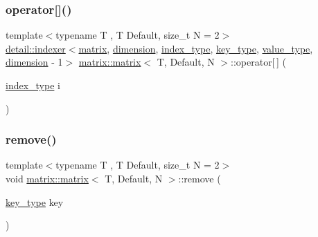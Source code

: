 \mbox{\label{structmatrix_1_1matrix_a06d5b697d7f64430305967f4adc80633}} 
\subsubsection{\texorpdfstring{operator[]()}{operator[]()}}
{\footnotesize\ttfamily template$<$typename T , T Default, size\+\_\+t N = 2$>$ \\
\hyperlink{structmatrix_1_1detail_1_1indexer}{detail\+::indexer}$<$\hyperlink{structmatrix_1_1matrix}{matrix}, \hyperlink{structmatrix_1_1matrix_a7d76bd51fd998974f59ea4035e053f74}{dimension}, \hyperlink{structmatrix_1_1matrix_a87b61e7f35dcd5991cd3f243cfeced06}{index\+\_\+type}, \hyperlink{structmatrix_1_1matrix_af7b5498ac1b615cb9ef51bd185a2557e}{key\+\_\+type}, \hyperlink{structmatrix_1_1matrix_ab940e7a84942339cdee7c0f0d3bd8ef9}{value\+\_\+type}, \hyperlink{structmatrix_1_1matrix_a7d76bd51fd998974f59ea4035e053f74}{dimension} -\/ 1$>$ \hyperlink{structmatrix_1_1matrix}{matrix\+::matrix}$<$ T, Default, N $>$\+::operator\mbox{[}$\,$\mbox{]} (\begin{DoxyParamCaption}\item[{\hyperlink{structmatrix_1_1matrix_a87b61e7f35dcd5991cd3f243cfeced06}{index\+\_\+type}}]{i }\end{DoxyParamCaption})\hspace{0.3cm}{\ttfamily [inline]}}

\mbox{\label{structmatrix_1_1matrix_ac15f926245fe20e9dfee3f0695299550}} 
\subsubsection{\texorpdfstring{remove()}{remove()}}
{\footnotesize\ttfamily template$<$typename T , T Default, size\+\_\+t N = 2$>$ \\
void \hyperlink{structmatrix_1_1matrix}{matrix\+::matrix}$<$ T, Default, N $>$\+::remove (\begin{DoxyParamCaption}\item[{\hyperlink{structmatrix_1_1matrix_af7b5498ac1b615cb9ef51bd185a2557e}{key\+\_\+type}}]{key }\end{DoxyParamCaption})\hspace{0.3cm}{\ttfamily [inline]}}

